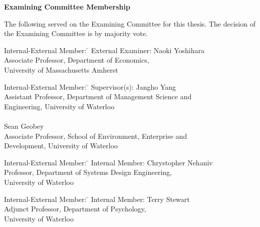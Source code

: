 \begin{center}\textbf{Examining Committee Membership}\end{center}
  \noindent
The following served on the Examining Committee for this thesis. The decision of the Examining Committee is by majority vote.
  \bigskip
  
  \noindent
\begin{tabbing}
Internal-External Member: \=  \kill %
External Examiner: \>  Naoki Yoshihara \\ 
\> Associate Professor, Department of Economics, \\
\> University of Massachusetts Amherst \\ %
\end{tabbing} 
  \bigskip
  
  \noindent
\begin{tabbing}
Internal-External Member: \=  \kill %
Supervisor(s): \> Jangho Yang \\
\> Assistant Professor, Department of Management Science and \\ 
\> Engineering, University of Waterloo \\ \\
\> Sean Geobey \\
\> Associate Professor, School of Environment, Enterprise and \\
\> Development, University of Waterloo \\
\end{tabbing}
  \bigskip

  \noindent
\begin{tabbing}
Internal-External Member: \=  \kill %
Internal Member: \> Chrystopher Nehaniv \\
\> Professor, Department of Systems Design Engineering, \\
\> University of Waterloo \\
\end{tabbing}
  \bigskip

  \noindent
\begin{tabbing}
Internal-External Member: \=  \kill %
Internal Member: \> Terry Stewart \\
\> Adjunct Professor, Department of Psychology, \\
\> University of Waterloo \\
\end{tabbing}
  \bigskip

